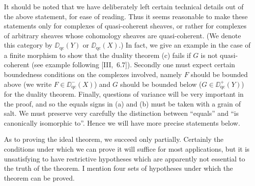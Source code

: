 It should be noted that we have deliberately left certain technical details out of the above statement, for ease of reading. Thus it seems reasonable to make these statements only for complexes of quasi-coherent sheaves, or rather for complexes of arbitrary sheaves whose cohomology sheaves are quasi-coherent. (We denote this category by $\DD_{\mathrm{qc}}(Y)$ or $\DD_{\mathrm{qc}}(X)$.) In fact, we give an example in the case of a finite morphism to show that the duality theorem (c) fails if $G$ is not quasi-coherent (see example following [III,~6.7]). Secondly one must expect certain boundedness conditions on the complexes involved, namely $F$ should be bounded above (we write $F\in \DD_{\mathrm{qc}}^{-}(X)$) and $G$ should be bounded below ($G\in \DD_{\mathrm{qc}}^{+}(Y)$) for the duality theorem. Finally, questions of variance will be very important in the proof, and so the equals signs in (a) and (b) must be taken with a grain of salt. We must preserve very carefully the distinction between ``equals'' and ``is canonically isomorphic to''. Hence we will have more precise statements below.

As to proving the ideal theorem, we succeed only partially. Certainly the conditions under which we can prove it will suffice for most applications, but it is unsatisfying to have restrictive hypotheses which are apparently not essential to the truth of the theorem. I mention four sets of hypotheses under which the theorem can be proved.

